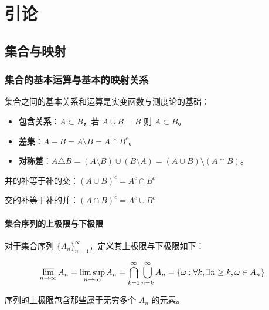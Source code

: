 \chapter{引论}

\section{集合与映射}

\subsection{集合的基本运算与基本的映射关系}

集合之间的基本关系和运算是实变函数与测度论的基础：

\begin{itemize}
  \item {\textbf{包含关系}：$A \subset B$，若 $A \cup B = B$ 则 $A \subset B$。}\item {\textbf{差集}：$A - B = A \setminus B = A \cap B^{c}$。}\item {\textbf{对称差}：$A \triangle B = (A \setminus B) \cup (B \setminus A) = (A \cup B) \setminus (A \cap B)$。}
\end{itemize}

\begin{theorem}

并的补等于补的交：$\displaystyle (A \cup B)^{c} = A^{c} \cap B^{c}$

交的补等于补的并：$\displaystyle (A \cap B)^{c} = A^{c} \cup B^{c}$

\end{theorem}

\subsubsection{集合序列的上极限与下极限}

对于集合序列 $\lbrace A_n \rbrace_{n=1}^{\infty}$，定义其上极限与下极限如下：

\begin{definition}[集合的上极限]

$$
\displaystyle \varlimsup_{n \to \infty} A_n= \limsup_{n \to \infty} A_n = \bigcap_{k=1}^{\infty} \bigcup_{n=k}^{\infty} A_n= \lbrace \omega: \forall k, \exists n \ge k, \omega \in A_n \rbrace
$$

序列的上极限包含那些属于无穷多个 $A_n$ 的元素。

\end{definition}

